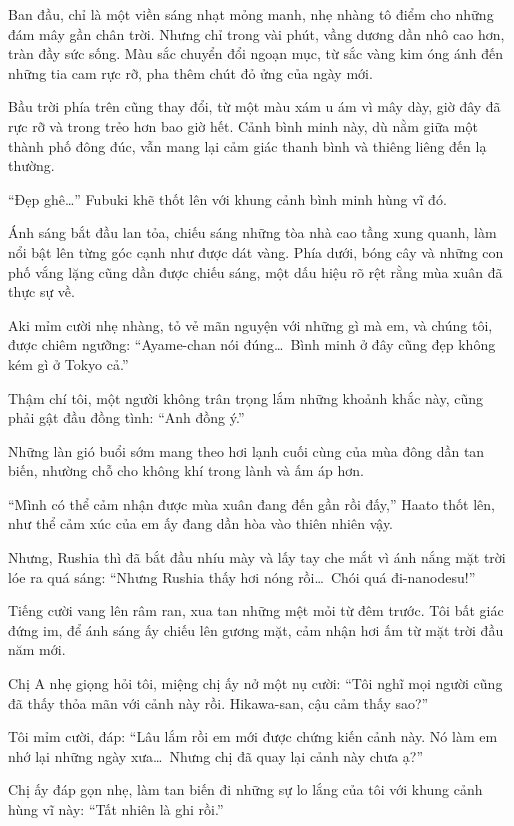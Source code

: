 \documentclass[../main.tex]{subfiles}
\begin{document}
Ban đầu, chỉ là một viền sáng nhạt mỏng manh, nhẹ nhàng tô điểm cho những đám mây gần chân trời. Nhưng chỉ trong vài phút, vầng dương dần nhô cao hơn, tràn đầy sức sống. Màu sắc chuyển đổi ngoạn mục, từ sắc vàng kim óng ánh đến những tia cam rực rỡ, pha thêm chút đỏ ửng của ngày mới.

Bầu trời phía trên cũng thay đổi, từ một màu xám u ám vì mây dày, giờ đây đã rực rỡ và trong trẻo hơn bao giờ hết. Cảnh bình minh này, dù nằm giữa một thành phố đông đúc, vẫn mang lại cảm giác thanh bình và thiêng liêng đến lạ thường.

``Đẹp ghê\dots'' Fubuki khẽ thốt lên với khung cảnh bình minh hùng vĩ đó.

Ánh sáng bắt đầu lan tỏa, chiếu sáng những tòa nhà cao tầng xung quanh, làm nổi bật lên từng góc cạnh như được dát vàng. Phía dưới, bóng cây và những con phố vắng lặng cũng dần được chiếu sáng, một dấu hiệu rõ rệt rằng mùa xuân đã thực sự về.

Aki mỉm cười nhẹ nhàng, tỏ vẻ mãn nguyện với những gì mà em, và chúng tôi, được chiêm ngưỡng: ``Ayame-chan nói đúng\dots\ Bình minh ở đây cũng đẹp không kém gì ở Tokyo cả.''

Thậm chí tôi, một người không trân trọng lắm những khoảnh khắc này, cũng phải gật đầu đồng tình: ``Anh đồng ý.''

Những làn gió buổi sớm mang theo hơi lạnh cuối cùng của mùa đông dần tan biến, nhường chỗ cho không khí trong lành và ấm áp hơn.

``Mình có thể cảm nhận được mùa xuân đang đến gần rồi đấy,'' Haato thốt lên, như thể cảm xúc của em ấy đang dần hòa vào thiên nhiên vậy.

Nhưng, Rushia thì đã bắt đầu nhíu mày và lấy tay che mắt vì ánh nắng mặt trời lóe ra quá sáng: ``Nhưng Rushia thấy hơi nóng rồi\dots\ Chói quá đi-nanodesu!''

Tiếng cười vang lên râm ran, xua tan những mệt mỏi từ đêm trước. Tôi bất giác đứng im, để ánh sáng ấy chiếu lên gương mặt, cảm nhận hơi ấm từ mặt trời đầu năm mới.

Chị A nhẹ giọng hỏi tôi, miệng chị ấy nở một nụ cười: ``Tôi nghĩ mọi người cũng đã thấy thỏa mãn với cảnh này rồi. Hikawa-san, cậu cảm thấy sao?''

Tôi mỉm cười, đáp: ``Lâu lắm rồi em mới được chứng kiến cảnh này. Nó làm em nhớ lại những ngày xưa\dots\ Nhưng chị đã quay lại cảnh này chưa ạ?''

Chị ấy đáp gọn nhẹ, làm tan biến đi những sự lo lắng của tôi với khung cảnh hùng vĩ này: ``Tất nhiên là ghi rồi.''
\end{document}
